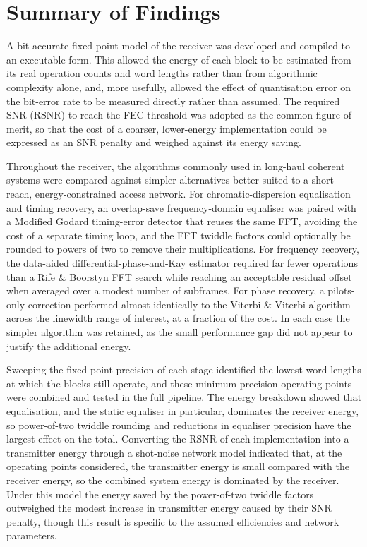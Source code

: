\documentclass[12pt,a4paper]{report}
\begin{document}
\section{Summary of Findings}
A bit-accurate fixed-point model of the receiver was developed and compiled to an executable form. This allowed the energy of each block to be estimated from its real operation counts and word lengths rather than from algorithmic complexity alone, and, more usefully, allowed the effect of quantisation error on the bit-error rate to be measured directly rather than assumed. The required SNR (RSNR) to reach the FEC threshold was adopted as the common figure of merit, so that the cost of a coarser, lower-energy implementation could be expressed as an SNR penalty and weighed against its energy saving.

Throughout the receiver, the algorithms commonly used in long-haul coherent systems were compared against simpler alternatives better suited to a short-reach, energy-constrained access network. For chromatic-dispersion equalisation and timing recovery, an overlap-save frequency-domain equaliser was paired with a Modified Godard timing-error detector that reuses the same FFT, avoiding the cost of a separate timing loop, and the FFT twiddle factors could optionally be rounded to powers of two to remove their multiplications. For frequency recovery, the data-aided differential-phase-and-Kay estimator required far fewer operations than a Rife \& Boorstyn FFT search while reaching an acceptable residual offset when averaged over a modest number of subframes. For phase recovery, a pilots-only correction performed almost identically to the Viterbi \& Viterbi algorithm across the linewidth range of interest, at a fraction of the cost. In each case the simpler algorithm was retained, as the small performance gap did not appear to justify the additional energy.

Sweeping the fixed-point precision of each stage identified the lowest word lengths at which the blocks still operate, and these minimum-precision operating points were combined and tested in the full pipeline. The energy breakdown showed that equalisation, and the static equaliser in particular, dominates the receiver energy, so power-of-two twiddle rounding and reductions in equaliser precision have the largest effect on the total. Converting the RSNR of each implementation into a transmitter energy through a shot-noise network model indicated that, at the operating points considered, the transmitter energy is small compared with the receiver energy, so the combined system energy is dominated by the receiver. Under this model the energy saved by the power-of-two twiddle factors outweighed the modest increase in transmitter energy caused by their SNR penalty, though this result is specific to the assumed efficiencies and network parameters.
\end{document}
